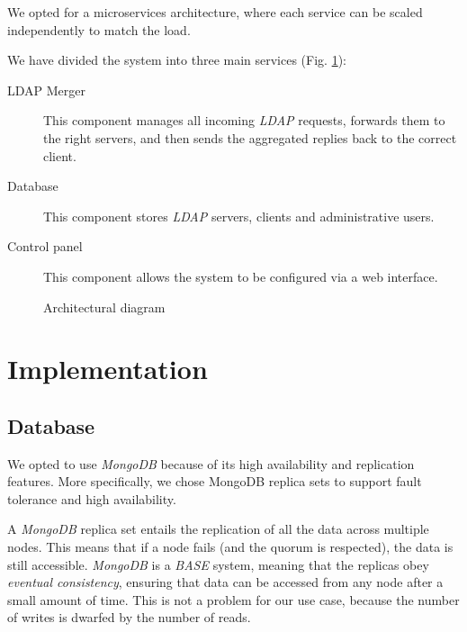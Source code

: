 \documentclass{scrartcl}
\begin{document}
\par We opted for a microservices architecture, where each service can be scaled independently to match the load.
\par We have divided the system into three main services (Fig. \ref{fig:arch}):
\begin{description}
    \item[LDAP Merger] This component manages all incoming \textit{LDAP} requests, forwards them to the right servers, and then sends the aggregated replies back to the correct client.
    \item[Database] This component stores \textit{LDAP} servers, clients and administrative users.
    \item[Control panel] This component allows the system to be configured via a web interface.
\end{description}

\begin{figure}
    \centering
    
    \caption{Architectural diagram}
    \label{fig:arch} 
\end{figure}

\section{Implementation}

\subsection{Database}
\par We opted to use \textit{MongoDB} because of its high availability and replication features. More specifically, we chose
MongoDB replica sets \cite{mongo_repl} to support fault tolerance and high availability.
\par A \textit{MongoDB} replica set entails the replication of all the data across multiple nodes. This means that if a node fails (and the quorum is respected), the data is still accessible. \textit{MongoDB} is a \textit{BASE} \cite{10.1145/269005.266662} system, meaning that the replicas obey \textit{eventual consistency}, ensuring that data can be accessed from any node after a small amount of time. This is not a problem for our use case, because the number of writes is dwarfed by the number of reads.
\end{document}
